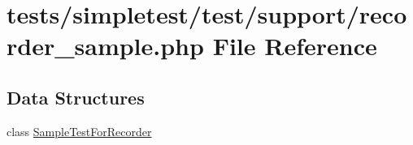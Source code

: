 \hypertarget{recorder__sample_8php}{\section{tests/simpletest/test/support/recorder\-\_\-sample.php File Reference}
\label{recorder__sample_8php}
}
\subsection*{Data Structures}
\begin{DoxyCompactItemize}
\item 
class \hyperlink{class_sample_test_for_recorder}{Sample\-Test\-For\-Recorder}
\end{DoxyCompactItemize}
